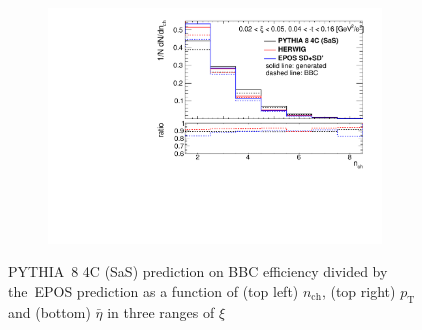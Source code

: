 \begin{figure}[h!]
\begin{subfigure}{.49\textwidth}
		\includegraphics[width=0.97\textwidth,page=15]{chapters/chrgSTAR/img/bbcCorrection/xi_bbc.pdf}
	\end{subfigure}
	\hfill
	\begin{minipage}{.47\textwidth}
		\caption{PYTHIA~8 4C (SaS) prediction on BBC efficiency  divided by the~EPOS prediction as a function of (top left) $n_\textrm{ch}$, (top right) $p_\textrm{T}$ and (bottom)  $\bar{\eta}$ in three ranges of $\xi$}
		\label{fig:bbcCorection_syst_EPOS}
	\end{minipage}
	\vspace{0.5cm}
\end{figure}

\FloatBarrier